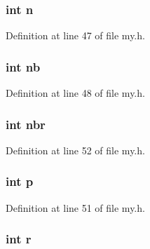 \hypertarget{structs__index_a76f11d9a0a47b94f72c2d0e77fb32240}{
\subsubsection[{n}]{\setlength{\rightskip}{0pt plus 5cm}int n}}\label{structs__index_a76f11d9a0a47b94f72c2d0e77fb32240}


Definition at line 47 of file my.\+h.

\hypertarget{structs__index_ab310c6afcc676eab3930dce2650511c0}{
\subsubsection[{nb}]{\setlength{\rightskip}{0pt plus 5cm}int nb}}\label{structs__index_ab310c6afcc676eab3930dce2650511c0}


Definition at line 48 of file my.\+h.

\hypertarget{structs__index_a8dd0ad1e89c554ecb23740525af3dc5d}{
\subsubsection[{nbr}]{\setlength{\rightskip}{0pt plus 5cm}int nbr}}\label{structs__index_a8dd0ad1e89c554ecb23740525af3dc5d}


Definition at line 52 of file my.\+h.

\hypertarget{structs__index_a533391314665d6bf1b5575e9a9cd8552}{
\subsubsection[{p}]{\setlength{\rightskip}{0pt plus 5cm}int p}}\label{structs__index_a533391314665d6bf1b5575e9a9cd8552}


Definition at line 51 of file my.\+h.

\hypertarget{structs__index_acab531abaa74a7e664e3986f2522b33a}{
\subsubsection[{r}]{\setlength{\rightskip}{0pt plus 5cm}int r}}\label{structs__index_acab531abaa74a7e664e3986f2522b33a}


